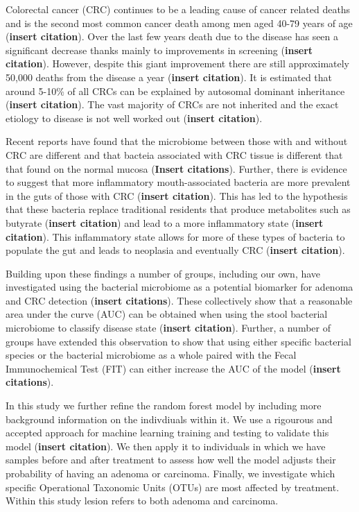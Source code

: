 \documentclass[12pt,]{article}
\begin{document}
Colorectal cancer (CRC) continues to be a leading cause of cancer
related deaths and is the second most common cancer death among men aged
40-79 years of age (\textbf{insert citation}). Over the last few years
death due to the disease has seen a significant decrease thanks mainly
to improvements in screening (\textbf{insert citation}). However,
despite this giant improvement there are still approximately 50,000
deaths from the disease a year (\textbf{insert citation}). It is
estimated that around 5-10\% of all CRCs can be explained by autosomal
dominant inheritance (\textbf{insert citation}). The vast majority of
CRCs are not inherited and the exact etiology to disease is not well
worked out (\textbf{insert citation}).

Recent reports have found that the microbiome between those with and
without CRC are different and that bacteia associated with CRC tissue is
different that that found on the normal mucosa (\textbf{Insert
citations}). Further, there is evidence to suggest that more
inflammatory mouth-associated bacteria are more prevalent in the guts of
those with CRC (\textbf{insert citation}). This has led to the
hypothesis that these bacteria replace traditional residents that
produce metabolites such as butyrate (\textbf{insert citation}) and lead
to a more inflammatory state (\textbf{insert citation}). This
inflammatory state allows for more of these types of bacteria to
populate the gut and leads to neoplasia and eventually CRC
(\textbf{insert citation}).

Building upon these findings a number of groups, including our own, have
investigated using the bacterial microbiome as a potential biomarker for
adenoma and CRC detection (\textbf{insert citations}). These
collectively show that a reasonable area under the curve (AUC) can be
obtained when using the stool bacterial microbiome to classify disease
state (\textbf{insert citation}). Further, a number of groups have
extended this observation to show that using either specific bacterial
species or the bacterial microbiome as a whole paired with the Fecal
Immunochemical Test (FIT) can either increase the AUC of the model
(\textbf{insert citations}).

In this study we further refine the random forest model by including
more background information on the indivdiuals within it. We use a
rigourous and accepted approach for machine learning training and
testing to validate this model (\textbf{insert citation}). We then apply
it to individuals in which we have samples before and after treatment to
assess how well the model adjusts their probability of having an adenoma
or carcinoma. Finally, we investigate which specific Operational
Taxonomic Units (OTUs) are most affected by treatment. Within this study
lesion refers to both adenoma and carcinoma.
\end{document}
